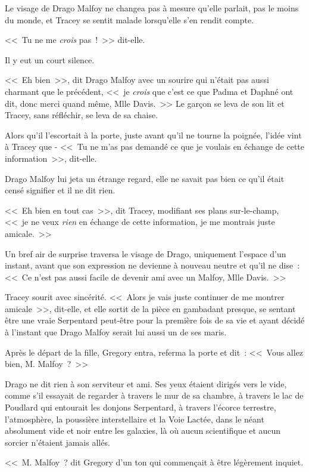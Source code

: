 Le visage de Drago Malfoy ne changea pas à mesure qu'elle parlait, pas le moins du monde, et Tracey se sentit malade lorsqu'elle s'en rendit compte.

<<~Tu ne me \emph{crois} pas~!~>> dit-elle.

Il y eut un court silence.

<<~Eh bien~>>, dit Drago Malfoy avec un sourire qui n'était pas aussi charmant que le précédent, <<~je \emph{crois} que c'est ce que Padma et Daphné ont dit, donc merci quand même, Mlle Davis.~>> Le garçon se leva de son lit et Tracey, sans réfléchir, se leva de sa chaise.

Alors qu'il l'escortait à la porte, juste avant qu'il ne tourne la poignée, l'idée vint à Tracey que - <<~Tu ne m'as pas demandé ce que je voulais en échange de cette information~>>, dit-elle.

Drago Malfoy lui jeta un étrange regard, elle ne savait pas bien ce qu'il était censé signifier et il ne dit rien.

<<~Eh bien en tout cas~>>, dit Tracey, modifiant ses plans sur-le-champ, <<~je ne veux \emph{rien} en échange de cette information, je me montrais juste amicale.~>>

Un bref air de surprise traversa le visage de Drago, uniquement l'espace d'un instant, avant que son expression ne devienne à nouveau neutre et qu'il ne dise~: <<~Ce n'est pas aussi facile de devenir ami avec un Malfoy, Mlle Davis.~>>

Tracey sourit avec sincérité. <<~Alors je vais juste continuer de me montrer amicale~>>, dit-elle, et elle sortit de la pièce en gambadant presque, se sentant être une vraie Serpentard peut-être pour la première fois de sa vie et ayant décidé à l'instant que Drago Malfoy serait lui aussi un de ses maris.

\later

Après le départ de la fille, Gregory entra, referma la porte et dit~: <<~Vous allez bien, M. Malfoy~?~>>

Drago ne dit rien à son serviteur et ami. Ses yeux étaient dirigés vers le vide, comme s'il essayait de regarder à travers le mur de sa chambre, à travers le lac de Poudlard qui entourait les donjons Serpentard, à travers l'écorce terrestre, l'atmosphère, la poussière interstellaire et la Voie Lactée, dans le néant absolument vide et noir entre les galaxies, là où aucun scientifique et aucun sorcier n'étaient jamais allés.

<<~M. Malfoy~? dit Gregory d'un ton qui commençait à être légèrement inquiet.

